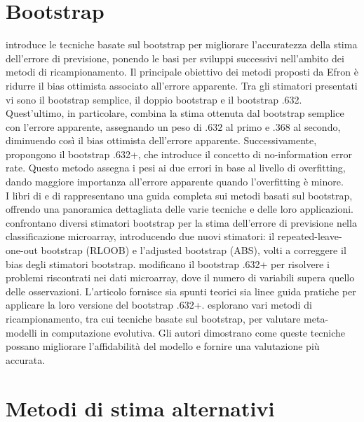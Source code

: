 \section{Bootstrap}
\label{sec:sezione7.3}


\textcite{efron1983} introduce le tecniche basate sul bootstrap per migliorare l’accuratezza della stima dell’errore di previsione, ponendo le basi per sviluppi successivi nell’ambito dei metodi di ricampionamento. Il principale obiettivo dei metodi proposti da Efron è ridurre il bias ottimista associato all’errore apparente. Tra gli stimatori presentati vi sono il bootstrap semplice, il doppio bootstrap e il bootstrap .632. Quest’ultimo, in particolare, combina la stima ottenuta dal bootstrap semplice con l’errore apparente, assegnando un peso di $.632$ al primo e $.368$ al secondo, diminuendo così il bias ottimista dell’errore apparente. Successivamente, \textcite{improvements} propongono il bootstrap .632+, che introduce il concetto di no-information error rate. Questo metodo assegna i pesi ai due errori in base al livello di overfitting, dando maggiore importanza all’errore apparente quando l’overfitting è minore.\\
I libri di \textcite{efron1993} e di \textcite{guideforpractitioners} rappresentano una guida completa sui metodi basati sul bootstrap, offrendo una panoramica dettagliata delle varie tecniche e delle loro applicazioni. \textcite{jiang2007} confrontano diversi stimatori bootstrap per la stima dell’errore di previsione nella classificazione microarray, introducendo due nuovi stimatori: il repeated-leave-one-out bootstrap (RLOOB) e l’adjusted bootstrap (ABS), volti a correggere il bias degli stimatori bootstrap. \textcite{jiang2013} modificano il bootstrap .632+ per risolvere i problemi riscontrati nei dati microarray, dove il numero di variabili supera quello delle osservazioni. L’articolo fornisce sia spunti teorici sia linee guida pratiche per applicare la loro versione del bootstrap .632+. \textcite{bischl} esplorano vari metodi di ricampionamento, tra cui tecniche basate sul bootstrap, per valutare meta-modelli in computazione evolutiva. Gli autori dimostrano come queste tecniche possano migliorare l’affidabilità del modello e fornire una valutazione più accurata.


\section{Metodi di stima alternativi}
\label{sec:sezione7.4}


